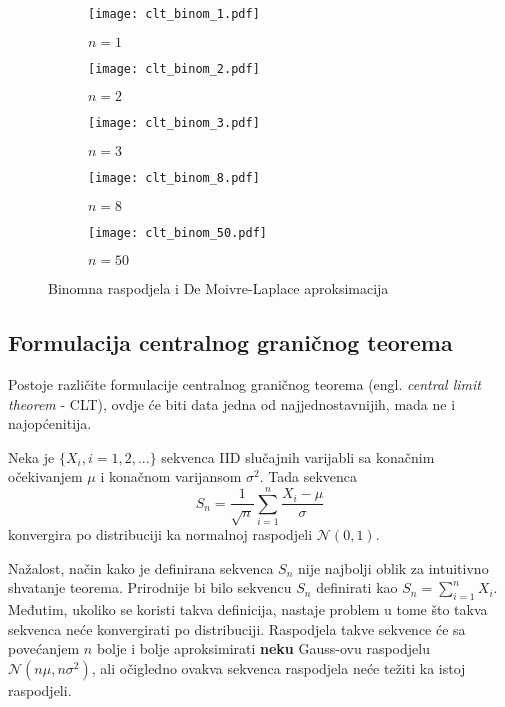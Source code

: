 \begin{figure}[H]
  \centering
  \begin{subfigure}[b]{0.3\textwidth}
    \centering
    \texttt{[image: clt\_binom\_1.pdf]}
    \caption{$n=1$}
    \label{fig:binom:a}
  \end{subfigure}
  \vspace{10pt}
	\begin{subfigure}[b]{0.3\textwidth}
		\centering
    \texttt{[image: clt\_binom\_2.pdf]}
    \caption{$n=2$}
    \label{fig:binom:b}
	\end{subfigure}
	\begin{subfigure}[b]{0.3\textwidth}
		\centering
    \texttt{[image: clt\_binom\_3.pdf]}
    \caption{$n=3$}
    \label{fig:binom:c}
	\end{subfigure}
	\begin{subfigure}[b]{0.3\textwidth}
		\centering
    \texttt{[image: clt\_binom\_8.pdf]}
    \caption{$n=8$}
    \label{fig:binom:d}
	\end{subfigure}
	\begin{subfigure}[b]{0.3\textwidth}
		\centering
    \texttt{[image: clt\_binom\_50.pdf]}
    \caption{$n=50$}
    \label{fig:binom:e}
	\end{subfigure}
	\caption{Binomna raspodjela i De Moivre-Laplace aproksimacija}
  \label{fig:binom}
\end{figure}

\subsection{Formulacija centralnog graničnog teorema}

Postoje različite formulacije centralnog graničnog teorema (engl.
\textit{central limit theorem} - CLT), ovdje će biti data jedna od
najjednostavnijih, mada ne i najopćenitija.
\begin{theorem} \label{th:clt}
  Neka je $\{X_i, i=1,2,...\}$ sekvenca IID slučajnih varijabli sa
  konačnim očekivanjem $\mu$ i konačnom varijansom $\sigma^2$. Tada
  sekvenca
  \begin{equation}
    S_n = \frac{1}{\sqrt{n}} \sum_{i=1}^{n} \frac{X_i-\mu}{\sigma}
  \end{equation}
  konvergira po distribuciji ka normalnoj raspodjeli $\mathcal{N}(0, 1)$.
\end{theorem}

Nažalost, način kako je definirana sekvenca $S_n$ nije najbolji oblik za
intuitivno shvatanje teorema. Prirodnije bi bilo sekvencu $S_n$ definirati kao
$S_n=\sum_{i=1}^{n} X_i$. Međutim, ukoliko se koristi takva definicija, nastaje
problem u tome što takva sekvenca neće konvergirati po distribuciji. Raspodjela
takve sekvence će sa povećanjem $n$ bolje i bolje aproksimirati \textbf{neku}
Gauss-ovu raspodjelu $\mathcal{N}(n\mu,n\sigma^2)$, ali očigledno ovakva sekvenca
raspodjela neće težiti ka istoj raspodjeli.

